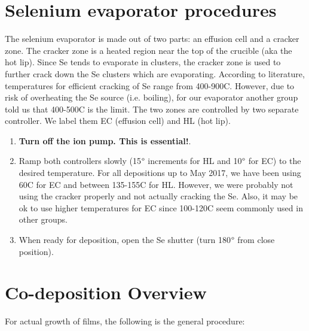 \section{Selenium evaporator procedures}
The selenium evaporator is made out of two parts: an effusion cell and a cracker zone. The cracker zone is a heated region near the top of the crucible (aka the hot lip). Since Se tends to evaporate in clusters, the cracker zone is used to further crack down the Se clusters which are evaporating. According to literature, temperatures for efficient cracking of Se range from 400-900C. However, due to risk of overheating the Se source (i.e. boiling), for our evaporator another group told us that 400-500C is the limit. The two zones are controlled by two separate controller. We label them EC (effusion cell) and HL (hot lip).
\begin{enumerate}
\item \textbf{Turn off the ion pump. This is essential!}.
\item Ramp both controllers slowly (15$\degree$ increments for HL and 10$\degree$ for EC) to the desired temperature. For all depositions up to May 2017, we have been using 60C for EC and between 135-155C for HL. However, we were probably not using the cracker properly and not actually cracking the Se. Also, it may be ok to use higher temperatures for EC since 100-120C seem commonly used in other groups.
\item When ready for deposition, open the Se shutter (turn 180$\degree$ from close position).
\end{enumerate}

\section{Co-deposition Overview}
For actual growth of films, the following is the general procedure:

